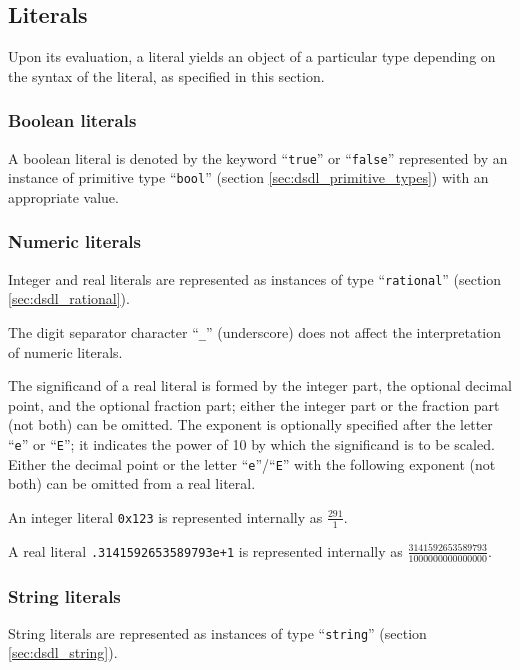 \subsection{Literals}

Upon its evaluation, a literal yields an object of a particular type depending on the syntax of the literal,
as specified in this section.

\subsubsection{Boolean literals}

A boolean literal is denoted by the keyword ``\verb|true|'' or ``\verb|false|''
represented by an instance of primitive type ``\verb|bool|'' (section \ref{sec:dsdl_primitive_types})
with an appropriate value.

\subsubsection{Numeric literals}

Integer and real literals are represented as instances of type ``\verb|rational|'' (section \ref{sec:dsdl_rational}).

The digit separator character ``\verb|_|'' (underscore) does not affect the interpretation of numeric literals.

The significand of a real literal is formed by the integer part, the optional decimal point,
and the optional fraction part;
either the integer part or the fraction part (not both) can be omitted.
The exponent is optionally specified after the letter ``\verb|e|'' or ``\verb|E|'';
it indicates the power of 10 by which the significand is to be scaled.
Either the decimal point or the letter ``\verb|e|''/``\verb|E|'' with the following exponent
(not both) can be omitted from a real literal.

\begin{remark}
    An integer literal \verb|0x123| is represented internally as $\frac{291}{1}$.

    A real literal \verb|.3141592653589793e+1| is represented internally as
    $\frac{3141592653589793}{1000000000000000}$.
\end{remark}

\subsubsection{String literals}

String literals are represented as instances of type ``\verb|string|'' (section \ref{sec:dsdl_string}).

